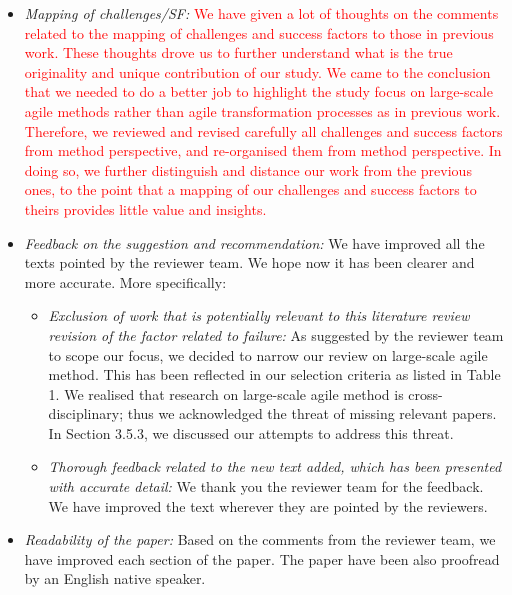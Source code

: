 \documentclass[a4paper,twoside,11pt]{reviewresponse}
\begin{document}
\begin{itemize}
	\item \textit{Mapping of challenges/SF:} \textcolor{red}{We have given a lot of thoughts on the comments related to the mapping of challenges and success factors to those in previous work. These thoughts drove us to further understand what is the true originality and unique contribution of our study. We came to the conclusion that we needed to do a better job to highlight the study focus on large-scale agile methods rather than agile transformation processes as in previous work. Therefore, we reviewed and revised carefully all challenges and success factors from method perspective, and re-organised them from method perspective. In doing so, we further distinguish and distance our work from the previous ones, to the point that a mapping of our challenges and success factors to theirs provides little value and insights.}
	\item \textit{Feedback on the suggestion and recommendation:} We have improved all the texts pointed by the reviewer team. We hope now it has been clearer and more accurate. More specifically:
		\begin{itemize}
			\item \textit{Exclusion of work that is potentially relevant to this literature review revision of the factor related to failure:} As suggested by the reviewer team to scope our focus, we decided to narrow our review on large-scale agile method. This has been reflected in our selection criteria as listed in Table 1. We realised that research on large-scale agile method is cross-disciplinary; thus we acknowledged the threat of missing relevant papers. In Section 3.5.3, we discussed our attempts to address this threat.
			\item \textit{Thorough feedback related to the new text added, which has been presented with accurate detail:} We thank you the reviewer team for the feedback. We have improved the text wherever they are pointed by the reviewers.
		\end{itemize}	
	\item \textit{Readability of the paper:} Based on the comments from the reviewer team, we have improved
each section of the paper. The paper have been also proofread by an English native speaker.
\end{itemize}

\clearpage
\end{document}
